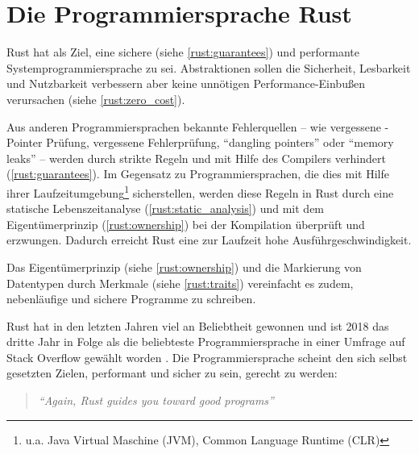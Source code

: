 
\chapter{Die Programmiersprache Rust}
\label{rust}

Rust hat als Ziel, eine sichere (siehe \autoref{rust:guarantees}) und performante Systemprogrammiersprache zu sei.
Abstraktionen sollen die Sicherheit, Lesbarkeit und Nutzbarkeit verbessern aber keine unnötigen Performance-Einbußen verursachen (siehe \autoref{rust:zero_cost}).

Aus anderen Programmiersprachen bekannte Fehlerquellen -- wie vergessene -Pointer Prüfung, vergessene Fehlerprüfung, \enquote{dangling pointers} oder \enquote{memory leaks} --  werden durch strikte Regeln und mit Hilfe des Compilers verhindert (\autoref{rust:guarantees}).
Im Gegensatz zu Programmiersprachen, die dies mit Hilfe ihrer Laufzeitumgebung\footnote{u.a. Java Virtual Maschine (JVM), Common Language Runtime (CLR)} sicherstellen, werden diese Regeln in Rust durch eine statische Lebenszeitanalyse (\autoref{rust:static_analysis}) und mit dem Eigentümerprinzip (\autoref{rust:ownership}) bei der Kompilation überprüft und erzwungen.
Dadurch erreicht Rust eine zur Laufzeit hohe Ausführgeschwindigkeit.

Das Eigentümerprinzip (siehe \autoref{rust:ownership}) und die Markierung von Datentypen durch Merkmale (siehe \autoref{rust:traits}) vereinfacht es zudem, nebenläufige und sichere Programme zu schreiben.

Rust hat in den letzten Jahren viel an Beliebtheit gewonnen und ist 2018 das dritte Jahr in Folge als die beliebteste Programmiersprache in einer Umfrage auf Stack Overflow gewählt worden \cite{rust:stack_overflow:mose_loved}.
Die Programmiersprache scheint den sich selbst gesetzten Zielen, performant und sicher zu sein, gerecht zu werden:

\begin{quotation}
	\textit{\enquote{Again, Rust guides you toward good programs}}
	\cite[497]{rust:orly_programming}
\end{quotation}

